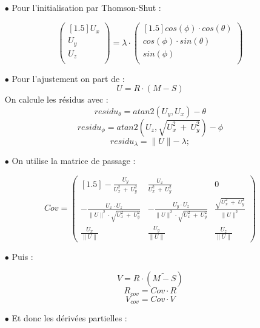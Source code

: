 \documentclass[french]{report}
\begin{document}
\begin{itemize}
\item[$\bullet$] Pour l'initialisation par Thomson-Shut :

$$\begin{pmatrix}[1.5] U_x \\ U_y \\ U_z \\ \end{pmatrix}
= \lambda \cdot
\begin{pmatrix}[1.5] cos(\phi) \cdot cos(\theta ) \\ cos(\phi) \cdot sin(\theta ) \\ sin(\phi) \\ \end{pmatrix} $$

\item[$\bullet$] Pour l'ajustement on part de :
$$U=R \cdot (M - S)$$
On calcule les résidus avec :
$$residu_{\theta} = atan2(U_y,U_x) - \theta$$
$$residu_{\phi} = atan2(U_z,\sqrt{U_x^2\ +\ U_y^2}) - \phi$$
$$residu_{\lambda} = \parallel U \parallel - \ \lambda;$$

\item[$\bullet$] On utilise la matrice de passage :


$$Cov = \begin{pmatrix}[1.5]
			- \frac{U_y}{U_x^2\ +\ U_y^2} & \frac{U_x}{U_x^2\ +\ U_y^2} & 0\\
			- \frac{{U_x} \cdot {U_z}}{\parallel U \parallel^2 \cdot \sqrt{U_x^2\ +\ U_y^2}} & - \frac{U_y \cdot U_z}{\parallel U \parallel^2 \cdot \sqrt{U_x^2\ +\ U_y^2}} & \frac{\sqrt{U_x^2\ +\ U_y^2}}{\parallel U \parallel^2} \\
			\frac{U_x}{\parallel U \parallel} & \frac{U_y}{\parallel U \parallel} & \frac{U_z}{\parallel U \parallel}
		\end{pmatrix}$$

\item[$\bullet$] Puis :

$$V = R \cdot (\widetilde{M-S})$$
$$R_{cov} = Cov \cdot R$$
$$V_{cov} = Cov \cdot V$$

\item[$\bullet$] Et donc les dérivées partielles :


\end{itemize}
\end{document}

